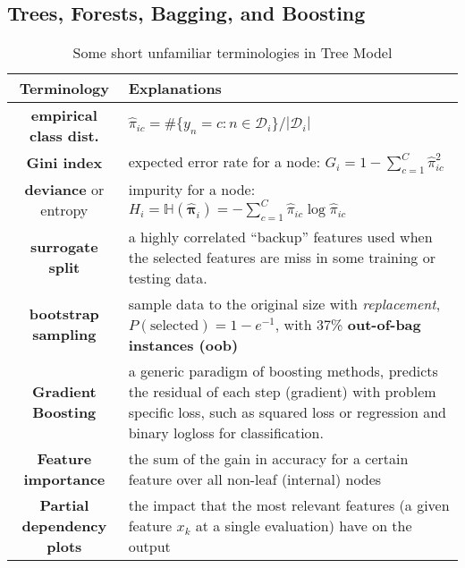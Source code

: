 \subsection{Trees, Forests, Bagging, and Boosting}

\begin{table}[htpb]
    \centering
    \caption{Some short unfamiliar terminologies in Tree Model}
    {\footnotesize

}
    {\small
    \begin{tabular}{cp{32em}}
        \toprule
        Terminology & Explanations \\
        \midrule
        \textbf{empirical class dist.} & $\hat{\pi}_{ic}={\#\{y_n=c:n\in\mathcal{D}_i\}}/{|\mathcal{D}_i|}$ \\
        \textbf{Gini index} & expected error rate for a node: $G_i=1-\sum_{c=1}^C\hat{\pi}_{ic}^2$ \\
        \textbf{deviance} or entropy & impurity for a node: $H_i=\mathbb{H}(\hat{\bm{\pi}}_i)=-\sum_{c=1}^C\hat{\pi}_{ic}\log\hat{\pi}_{ic}$ \\
        \textbf{surrogate split} & a highly correlated ``backup'' features used when the selected features are miss in some training or testing data. \\
        \textbf{bootstrap sampling} & sample data to the original size with \textit{replacement}, $P(\text{selected})=1-e^{-1}$, with 37\% \textbf{out-of-bag instances (oob)} \\ 
        \textbf{Gradient Boosting} & a generic paradigm of boosting methods, predicts the residual of each step (gradient) with problem specific loss, such as squared loss or regression and binary logloss for classification.\\
        \textbf{Feature importance} & the sum of the gain in accuracy for a certain feature over all non-leaf (internal) nodes \\
        \textbf{Partial dependency plots} & the impact that the most relevant features (a given feature $x_k$ at a single evaluation) have on the output \\
        \bottomrule
    \end{tabular}}
    \label{tab:treemodel}
\end{table}

